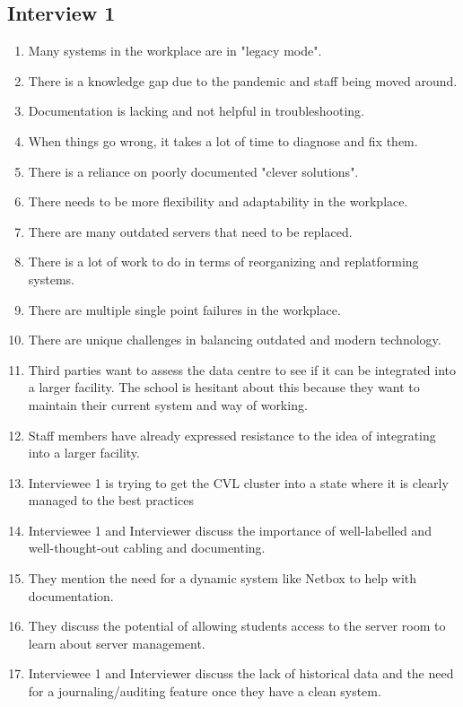 \subsection{Interview 1}
\label {sec:thematicAnalysisInterview1}
\begin{enumerate}  
    \item Many systems in the workplace are in "legacy mode".
    \item There is a knowledge gap due to the pandemic and staff being moved around.
    \item Documentation is lacking and not helpful in troubleshooting.
    \item When things go wrong, it takes a lot of time to diagnose and fix them.
    \item There is a reliance on poorly documented "clever solutions".
    \item There needs to be more flexibility and adaptability in the workplace.
    \item There are many outdated servers that need to be replaced.
    \item There is a lot of work to do in terms of reorganizing and replatforming systems.
    \item There are multiple single point failures in the workplace.
    \item There are unique challenges in balancing outdated and modern technology.
    \item Third parties want to assess the data centre to see if it can be integrated into a larger facility. The school is hesitant about this because they want to maintain their current system and way of working.
    \item Staff members have already expressed resistance to the idea of integrating into a larger facility.
    \item Interviewee 1 is trying to get the CVL cluster into a state where it is clearly managed to the best practices
    \item Interviewee 1 and Interviewer discuss the importance of well-labelled and well-thought-out cabling and documenting.
    \item They mention the need for a dynamic system like Netbox to help with documentation.
    \item They discuss the potential of allowing students access to the server room to learn about server management.
    \item Interviewee 1 and Interviewer discuss the lack of historical data and the need for a journaling/auditing feature once they have a clean system.

\end{enumerate}

